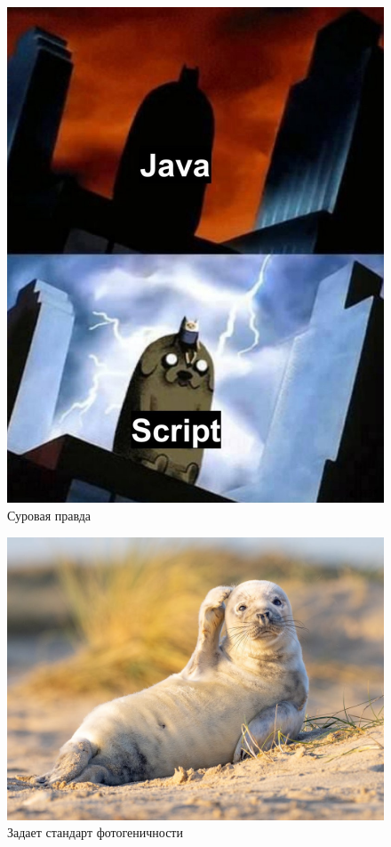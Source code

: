 \documentclass[a4paper, 12pt]{article}
\begin{document}
\newpage
\begin{figure}[t]
  \centering
  \includegraphics[scale=0.18]{image_1}
  \caption{Суровая правда}
\end{figure}
\begin{figure}[b]
  \centering
  \includegraphics[scale=0.20]{image_2}
  \caption{Задает стандарт фотогеничности}
\end{figure}
\end{document}

